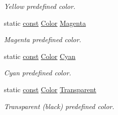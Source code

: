 \begin{DoxyCompactItemize}
\begin{DoxyCompactList}\small\item\em Yellow predefined color. \end{DoxyCompactList}\item 
static \hyperlink{term__entry_8h_a57bd63ce7f9a353488880e3de6692d5a}{const} \hyperlink{classsf_1_1_color}{Color} \hyperlink{classsf_1_1_color_a9ee8537b23a72bff51d8f20f4894519e}{Magenta}
\begin{DoxyCompactList}\small\item\em Magenta predefined color. \end{DoxyCompactList}\item 
static \hyperlink{term__entry_8h_a57bd63ce7f9a353488880e3de6692d5a}{const} \hyperlink{classsf_1_1_color}{Color} \hyperlink{classsf_1_1_color_a1a5568e8b58269f1c739237e31bed9d8}{Cyan}
\begin{DoxyCompactList}\small\item\em Cyan predefined color. \end{DoxyCompactList}\item 
static \hyperlink{term__entry_8h_a57bd63ce7f9a353488880e3de6692d5a}{const} \hyperlink{classsf_1_1_color}{Color} \hyperlink{classsf_1_1_color_a422c310394afa396d3a2798aad982145}{Transparent}
\begin{DoxyCompactList}\small\item\em Transparent (black) predefined color. \end{DoxyCompactList}\end{DoxyCompactItemize}
